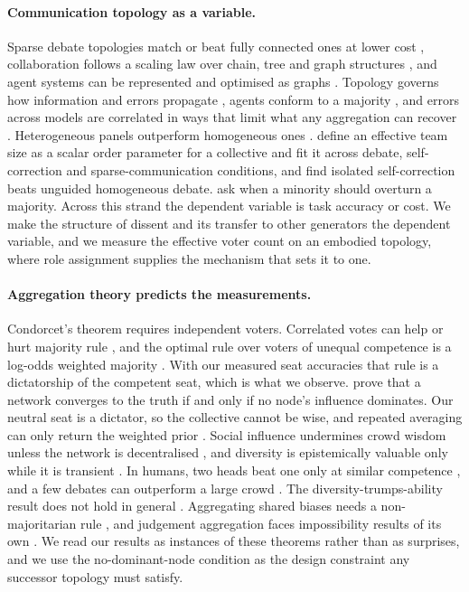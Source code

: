 \paragraph{Communication topology as a variable.}
Sparse debate topologies match or beat fully connected ones at lower cost
\citep{li2024sparse}, collaboration follows a scaling law over chain, tree
and graph structures \citep{qian2025macnet}, and agent systems can be
represented and optimised as graphs \citep{zhuge2024gptswarm,liu2024dylan}.
Topology governs how information and errors propagate
\citep{shen2025propagation,han2026conformity}, agents conform to a majority
\citep{zhang2024socialpsych,weng2025conformity}, and errors across models are
correlated in ways that limit what any aggregation can recover
\citep{kim2025correlated}. Heterogeneous panels outperform homogeneous ones
\citep{wang2025moa}. \citet{bertalanic2026ringelmann} define an effective
team size as a scalar order parameter for a collective and fit it across
debate, self-correction and sparse-communication conditions, and
\citet{bertalanic2026costconsensus} find isolated self-correction beats
unguided homogeneous debate. \citet{he2026minoritysentinel} ask when a
minority should overturn a majority. Across this strand the dependent
variable is task accuracy or cost. We make the structure of dissent and its
transfer to other generators the dependent variable, and we measure the
effective voter count on an embodied topology, where role assignment
supplies the mechanism that sets it to one.

\paragraph{Aggregation theory predicts the measurements.}
Condorcet's theorem requires independent voters. Correlated votes can help
or hurt majority rule \citep{ladha1992condorcet,boland1989majority}, and the
optimal rule over voters of unequal competence is a log-odds weighted
majority \citep{shapley1984optimizing,nitzan1982optimal}. With our measured
seat accuracies that rule is a dictatorship of the competent seat, which is
what we observe. \citet{golub2010naive} prove that a network converges to
the truth if and only if no node's influence dominates. Our neutral seat is
a dictator, so the collective cannot be wise, and repeated averaging can only
return the weighted prior \citep{degroot1974reaching}. Social influence
undermines crowd wisdom \citep{lorenz2011social} unless the network is
decentralised \citep{becker2017network}, and diversity is epistemically
valuable only while it is transient \citep{zollman2010epistemic}. In humans,
two heads beat one only at similar competence \citep{bahrami2010optimally},
and a few debates can outperform a large crowd \citep{navajas2018aggregated}.
The diversity-trumps-ability result \citep{hong2004groups} does not hold in
general \citep{thompson2014diversity}. Aggregating shared biases needs a
non-majoritarian rule \citep{prelec2017solution}, and judgement aggregation
faces impossibility results of its own \citep{list2002aggregating}. We read
our results as instances of these theorems rather than as surprises, and we
use the no-dominant-node condition as the design constraint any successor
topology must satisfy.


